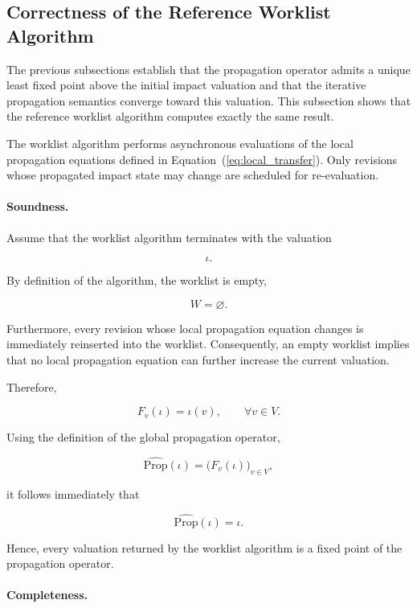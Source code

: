 \documentclass[10pt]{article}
\begin{document}
\subsection{Correctness of the Reference Worklist Algorithm}

The previous subsections establish that the propagation operator admits a
unique least fixed point above the initial impact valuation and that the
iterative propagation semantics converge toward this valuation. This subsection
shows that the reference worklist algorithm computes exactly the same result.

The worklist algorithm performs asynchronous evaluations of the local
propagation equations defined in
Equation~(\ref{eq:local_transfer}).
Only revisions whose propagated impact state may change are scheduled for
re-evaluation.

\paragraph{Soundness.}

Assume that the worklist algorithm terminates with the valuation

\[
\iota.
\]

By definition of the algorithm, the worklist is empty,

\[
W=\varnothing.
\]

Furthermore, every revision whose local propagation equation changes is
immediately reinserted into the worklist. Consequently, an empty worklist
implies that no local propagation equation can further increase the current
valuation.

Therefore,

\[
F_v(\iota)
=
\iota(v),
\qquad
\forall v\in V.
\]

Using the definition of the global propagation operator,

\[
\widehat{\mathrm{Prop}}(\iota)
=
\bigl(
F_v(\iota)
\bigr)_{v\in V},
\]

it follows immediately that

\begin{equation}
	\label{eq:worklist_soundness}
	\widehat{\mathrm{Prop}}(\iota)
	=
	\iota.
\end{equation}

Hence, every valuation returned by the worklist algorithm is a fixed point of
the propagation operator.

\paragraph{Completeness.}
\end{document}
